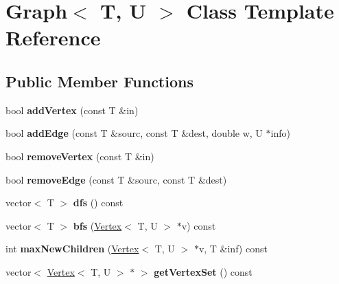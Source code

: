 \hypertarget{class_graph}{}\section{Graph$<$ T, U $>$ Class Template Reference}
\label{class_graph}
\subsection*{Public Member Functions}
\begin{DoxyCompactItemize}
\item 
bool {\bfseries add\+Vertex} (const T \&in)\hypertarget{class_graph_a70d7259821edbd3bfb761ee92f6668fc}{}\label{class_graph_a70d7259821edbd3bfb761ee92f6668fc}

\item 
bool {\bfseries add\+Edge} (const T \&sourc, const T \&dest, double w, U $\ast$info)\hypertarget{class_graph_aeb2bf6b1f666f8c5b659325cddd806cd}{}\label{class_graph_aeb2bf6b1f666f8c5b659325cddd806cd}

\item 
bool {\bfseries remove\+Vertex} (const T \&in)\hypertarget{class_graph_abf61b7ef157d8e5c56e404399d4c9a63}{}\label{class_graph_abf61b7ef157d8e5c56e404399d4c9a63}

\item 
bool {\bfseries remove\+Edge} (const T \&sourc, const T \&dest)\hypertarget{class_graph_ade8294547819c04a530c2157f5e0d16d}{}\label{class_graph_ade8294547819c04a530c2157f5e0d16d}

\item 
vector$<$ T $>$ {\bfseries dfs} () const \hypertarget{class_graph_a15520c203949e8619c10070b0ca6f8d2}{}\label{class_graph_a15520c203949e8619c10070b0ca6f8d2}

\item 
vector$<$ T $>$ {\bfseries bfs} (\hyperlink{class_vertex}{Vertex}$<$ T, U $>$ $\ast$v) const \hypertarget{class_graph_a1ffa3fe6084ccb775037bd1650a61d89}{}\label{class_graph_a1ffa3fe6084ccb775037bd1650a61d89}

\item 
int {\bfseries max\+New\+Children} (\hyperlink{class_vertex}{Vertex}$<$ T, U $>$ $\ast$v, T \&inf) const \hypertarget{class_graph_a2e3db290fb8900bd7dfaff66ad8daadf}{}\label{class_graph_a2e3db290fb8900bd7dfaff66ad8daadf}

\item 
vector$<$ \hyperlink{class_vertex}{Vertex}$<$ T, U $>$ $\ast$ $>$ {\bfseries get\+Vertex\+Set} () const \hypertarget{class_graph_af7b2c274005f79c8a2fa9a8930310d07}{}\label{class_graph_af7b2c274005f79c8a2fa9a8930310d07}


\end{DoxyCompactItemize}
